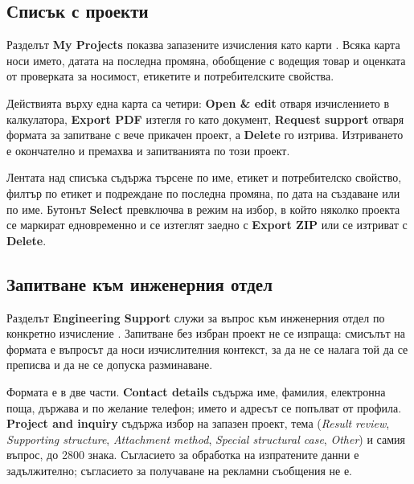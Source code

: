 \subsection{Списък с проекти}
\label{subsec:ug-dashboard}

Разделът \textbf{My Projects} показва запазените изчисления като карти
. Всяка карта носи името, датата на последна промяна,
обобщение с водещия товар и оценката от проверката за носимост, етикетите и
потребителските свойства.


Действията върху една карта са четири: \textbf{Open \& edit} отваря изчислението в
калкулатора, \textbf{Export PDF} изтегля го като документ, \textbf{Request support}
отваря формата за запитване с вече прикачен проект, а \textbf{Delete} го изтрива.
Изтриването е окончателно и премахва и запитванията по този проект.

Лентата над списъка съдържа търсене по име, етикет и потребителско свойство, филтър по
етикет и подреждане по последна промяна, по дата на създаване или по име. Бутонът
\textbf{Select} превключва в режим на избор, в който няколко проекта се маркират
едновременно и се изтеглят заедно с \textbf{Export ZIP} или се изтриват с
\textbf{Delete}.

\subsection{Запитване към инженерния отдел}
\label{subsec:ug-support}

Разделът \textbf{Engineering Support} служи за въпрос към инженерния отдел по конкретно
изчисление . Запитване без избран проект не се изпраща: смисълът
на формата е въпросът да носи изчислителния контекст, за да не се налага той да се
преписва и да не се допуска разминаване.


Формата е в две части. \textbf{Contact details} съдържа име, фамилия, електронна поща,
държава и по желание телефон; името и адресът се попълват от профила. \textbf{Project
and inquiry} съдържа избор на запазен проект, тема (\emph{Result review},
\emph{Supporting structure}, \emph{Attachment method}, \emph{Special structural case},
\emph{Other}) и самия въпрос, до 2800 знака. Съгласието за обработка на изпратените
данни е задължително; съгласието за получаване на рекламни съобщения не е.

